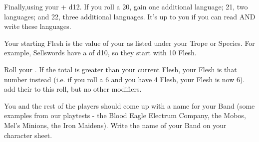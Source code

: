 {Finally,\RO using your \INT + d12.  If you roll a 20, gain one additional language; 21, two languages; and 22, three additional languages. It's up to you if you can read AND write these languages.



Your starting Flesh is the \MAX value of your \FLESH as listed under your Trope or Species.  For example, Sellswords have a \FLESH of d10, so they start with 10 Flesh.  

Roll your \VIG.  If the total is greater than your current Flesh, your Flesh is that number instead (i.e. if you roll a 6 and you have 4 Flesh, your Flesh is now 6).  add their \LVL to this roll, but no other modifiers.


  You and the rest of the players should come up with a name for your Band (some examples from our playtests - the Blood Eagle Electrum Company, the Mobos, Mel's Minions, the Iron Maidens).  Write the name of your Band on your character sheet.

} %
